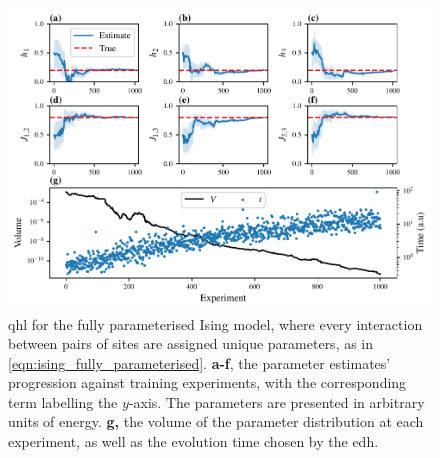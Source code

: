 \begin{figure}
    \begin{center}
        \includegraphics{theoretical_study/figures/fully_param_ising_qhl.pdf}
    \end{center}
    \caption[ for the fully parameterised Ising model]{
        \Acrlong{qhl} for the fully parameterised Ising model, 
            where every interaction between pairs of sites are assigned unique parameters, 
            as in \cref{eqn:ising_fully_parameterised}. 
        \textbf{a-f}, the parameter estimates' progression against training \glspl{experiment}, 
            with the corresponding term labelling the $y$-axis. 
            The parameters are presented in arbitrary units of energy. 
        \textbf{g,} the \gls{volume} of the parameter distribution at each experiment, 
            as well as the evolution time chosen by the \gls{edh}.  
        \figtableref
    }
    \label{fig:ising_fully_parameterised}
\end{figure}

